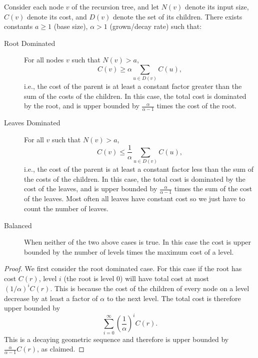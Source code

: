 \begin{flex}
\label{grp:def:analysis::brick-method}

\begin{definition}
\label{def:analysis::brick-method}
Consider each node $v$ of the recursion tree, and let $N(v)$ denote  
its input size, $C(v)$ denote its cost, and $D(v)$ denote the set of
its children.   There exists constants $a \geq 1$ (base size), $\alpha
> 1$ (grown/decay rate) such that:

\begin{description}

\item[Root Dominated]
For all nodes $v$ such that $N(v) > a$,
\[C(v) \geq \alpha \sum_{u \in D(v)} C(u),\]
i.e., the cost of the parent is at least a
constant factor greater than the sum of the 
costs of the children.  In this case, the total cost is dominated by
the root, and is upper bounded 
by $\frac{\alpha}{\alpha - 1}$ times the cost of the root. 

\item[Leaves Dominated]
For all $v$ such that $N(v) > a$, 
\[C(v) \leq \frac{1}{\alpha} \sum_{u \in D(v)} C(u),\]
i.e., the cost of the parent is at least a
constant factor less than the sum of the costs of the 
children.   In this case,
the total cost is dominated by the cost of the leaves, and is upper bounded by $\frac{\alpha}{\alpha - 1}$ times the
sum of the cost of the leaves.
Most often all leaves have constant cost so we just have to count the
number of leaves.

\item[Balanced]
When neither of the two above cases is true.     In this case the cost
is upper bounded by the number of levels times the maximum cost of a
level.
\end{description}

\end{definition}

\begin{proof}
\label{prf:analysis::recurrences::consider}
  We first consider the root dominated case.  For this case if the
  root has cost $C(r)$, level $i$ (the root is level $0$) will have
  total cost at most $(1/\alpha)^i C(r)$.  
  This is because the cost of the children of every node on a level
  decrease by at least a factor of $\alpha$ to the next level.  
  The total cost is therefore upper bounded by
  \[ \sum_{i=0}^{\infty} \left(\frac{1}{\alpha}\right)^i C(r).   \]
  This is a decaying geometric sequence and therefore is upper bounded
  by $\frac{\alpha}{\alpha - 1} C(r)$, as claimed.


\end{proof}
\end{flex}
